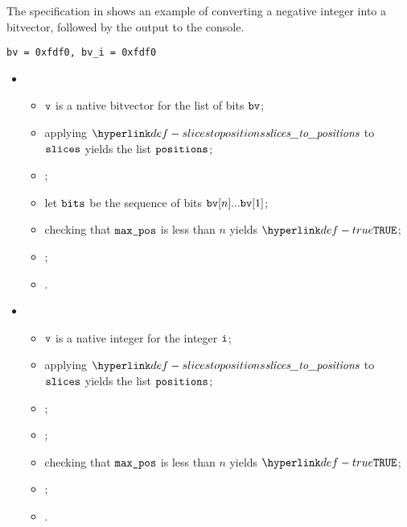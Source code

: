 The specification in  shows an example of converting a negative
integer into a bitvector, followed by the output to the console.

\begin{Verbatim}[fontsize=\footnotesize, frame=single]
bv = 0xfdf0, bv_i = 0xfdf0
\end{Verbatim}

\ProseParagraph
\OneApplies
\begin{itemize}
  \item {}
  \begin{itemize}
    \item $\texttt{v}$ is a native bitvector for the list of bits $\texttt{bv}$;
    \item applying $\slicestopositions$ to $\texttt{slices}$ yields the list $\texttt{positions}$\ProseOrError;
    \item {};
    \item let $\texttt{bits}$ be the sequence of bits $\texttt{bv}[n] ... \texttt{bv}[1]$;
    \item checking that $\texttt{max\_pos}$ is less than $n$ yields $\True$\ProseTerminateAs{\BadIndex};
    \item {};
    \item {}.
  \end{itemize}

  \item {}
  \begin{itemize}
    \item $\texttt{v}$ is a native integer for the integer $\texttt{i}$;
    \item applying $\slicestopositions$ to $\texttt{slices}$ yields the list $\texttt{positions}$\ProseOrError;
    \item {};
    \item {};
    \item checking that $\texttt{max\_pos}$ is less than $n$ yields $\True$\ProseTerminateAs{\BadIndex};
    \item {};
    \item {}.
  \end{itemize}
\end{itemize}

